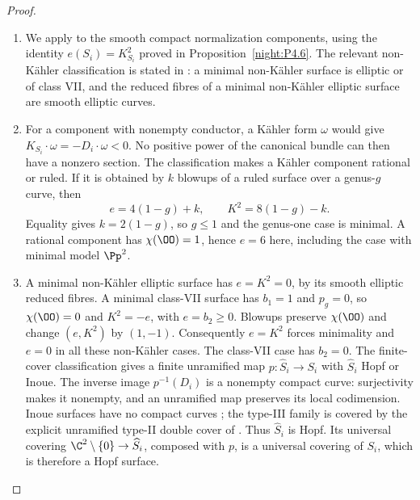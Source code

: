 \begin{proof}

\begin{enumerate}[label={$\langle1\rangle$\arabic*.},leftmargin=*]
\item We apply \cite[Chapter~VI, Theorem~1.1 and Table~10, pp.~243--244]{BHPV2004E} to the smooth compact
normalization components, using the identity $e(S_i)=K_{S_i}^2$ proved
in Proposition~\ref{night:P4.6}. The relevant non-Kähler classification is stated in
\cite[arXiv version~3, Theorem~4.2, pp.~17--18; Theorem~5.1 and proof, pp.~27--29]{OVV2020}: a minimal non-Kähler
surface is elliptic or of class VII, and the reduced fibres of a
minimal non-Kähler elliptic surface are smooth elliptic curves.

\item For a component with nonempty conductor, a Kähler form $\omega$ would
give $K_{S_i}\cdot\omega=-D_i\cdot\omega<0$. No positive power of
the canonical bundle can then have a nonzero section. The classification
makes a Kähler component rational or ruled. If it is obtained by $k$
blowups of a ruled surface over a genus-$g$ curve, then
\[
 e=4(1-g)+k,\qquad K^2=8(1-g)-k.
\]
Equality gives $k=2(1-g)$, so $g\le1$ and the genus-one case is minimal.
A rational component has $\chi(\OO)=1$, hence $e=6$ here, including
the case with minimal model $\Pp^2$.

\item A minimal non-Kähler elliptic surface has $e=K^2=0$, by its smooth
elliptic reduced fibres. A minimal class-VII surface has $b_1=1$ and
$p_g=0$, so $\chi(\OO)=0$ and $K^2=-e$, with $e=b_2\ge0$.
Blowups preserve $\chi(\OO)$ and change $(e,K^2)$ by $(1,-1)$.
Consequently $e=K^2$ forces minimality and $e=0$ in all these
non-Kähler cases. The class-VII case has $b_2=0$. The finite-cover classification
\cite[arXiv version~3, Theorem~1, p.~1]{BBK2019} gives a finite
unramified map $p:\widehat S_i\to S_i$ with $\widehat S_i$ Hopf
or Inoue. The inverse image $p^{-1}(D_i)$ is a nonempty compact
curve: surjectivity makes it nonempty, and an unramified map preserves
its local codimension. Inoue surfaces have no compact curves
\cite[Theorem~3.1, p.~303]{KhaledTeleman2026Journal}; the type-III
family is covered by the explicit unramified type-II double cover
of \cite[proof of Remark~3.5, p.~305]{KhaledTeleman2026Journal}.
Thus $\widehat S_i$ is Hopf. Its universal covering
$\C^2\setminus\{0\}\to\widehat S_i$, composed with $p$, is a
universal covering of $S_i$, which is therefore a Hopf surface.


\end{enumerate}
\end{proof}
